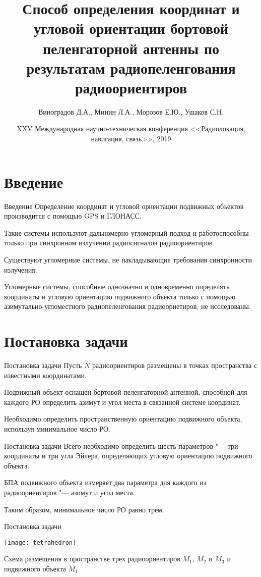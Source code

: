 \documentclass[russian,hyperref={unicode}]{beamer}
\title{Способ определения координат и угловой ориентации бортовой пеленгаторной антенны по результатам радиопеленгования радиоориентиров}
\institute
{
  \inst{1}%
  Военно-воздушная академия имени профессора Н.Е.Жуковского и Ю.А.Гагарина\\
  \inst{2}%
	Воронежский Государственный Университет
}
\author
{
  Виноградов Д.А.\inst{1}, Минин Л.А.\inst{2}, Морозов Е.Ю.\inst{2}, Ушаков С.Н\inst{2}.
}
\date[RLNC 2019]{XXV Международная научно-техническая конференция <<Радиолокация, навигация, связь>>, 2019}
\begin{document}
  \frame{\titlepage}

  \section{Введение}
  \begin{frame}{Введение}
    Определение координат и угловой ориентации подвижных объектов производится с
    помощью GPS и ГЛОНАСС.

    Такие системы используют дальномерно-угломерный подход и работоспособны только
    при синхронном излучении радиосигналов радиоориентиров.

    Существуют угломерные системы, не накладывающие требования синхронности излучения.

    Угломерные системы, способные однозначно и одновременно определять координаты и
    угловую ориентацию подвижного объекта только с помощью азимутально-угломестного радиопеленгования
    радиоориетиров, не исследованы.
  \end{frame}

  \section{Постановка задачи}
  \begin{frame}{Постановка задачи}
      Пусть $N$ радиоориентиров размещены в точках пространства с известными координатами.

      Подвижный объект оснащен бортовой пеленгаторной антенной, способной для каждого
      РО определить азимут и угол места в связанной системе координат.

      Необходимо определить пространственную ориентацию подвижного объекта,
      используя минимальное число РО.
  \end{frame}

  \begin{frame}{Постановка задачи}
    Всего необходимо определить шесть параметров "--- три координаты и три угла Эйлера,
    определяющих угловую ориентацию подвижного объекта.

    БПА подвижного объекта измеряет два параметра для каждого из радиоориентиров "---
    азимут и угол места.

    Таким образом, минимальное число РО равно трем.
  \end{frame}

  \begin{frame}{Постановка задачи}
    \begin{center}
      \texttt{[image: tetrahedron]}

      Схема размещения в пространстве трех радиоориентиров $M_1$, $M_2$ и $M_3$ и подвижного объекта $M_1$
    \end{center}
  \end{frame}
\end{document}
